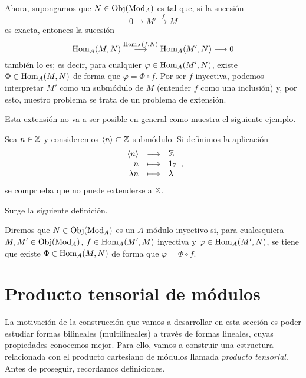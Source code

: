 \documentclass[../main.tex]{subfiles}
\begin{document}
Ahora, supongamos que $N\in\operatorname{Obj}(\operatorname{Mod}_A)$ es tal que, si la sucesión
$$0\longrightarrow M'\overset{f}{\longrightarrow}M$$
es exacta, entonces la sucesión
$$\operatorname{Hom}_A(M,N)\overset{\operatorname{Hom}_A(f,N)}{\longrightarrow}\operatorname{Hom}_A(M',N)\longrightarrow0$$
también lo es; es decir, para cualquier $\varphi\in\operatorname{Hom}_A(M',N)$, existe $\Phi\in\operatorname{Hom}_A(M,N)$ de forma que $\varphi=\Phi\circ f$. Por ser $f$ inyectiva, podemos interpretar $M'$ como un submódulo de $M$ (entender $f$ como una inclusión) y, por esto, nuestro problema se trata de un problema de extensión.

Esta extensión no va a ser posible en general como muestra el siguiente ejemplo.
\begin{example}
	Sea $n\in\mathbb{Z}$ y consideremos $\langle n\rangle\subset\mathbb{Z}$ submódulo. Si definimos la aplicación
	$$\begin{array}{rcl}
	\langle n\rangle&\longrightarrow&\mathbb{Z}\\
	n&\longmapsto&1_{\mathbb{Z}}\\
	\lambda n&\longmapsto&\lambda
	\end{array},$$
	se comprueba que no puede extenderse a $\mathbb{Z}$.
\end{example}

Surge la siguiente definición.

\begin{definition}
	Diremos que $N\in\operatorname{Obj}(\operatorname{Mod}_A)$ es un $A$-módulo inyectivo si, para cualesquiera $M,M'\in\operatorname{Obj}(\operatorname{Mod}_A)$, $f\in\operatorname{Hom}_A(M',M)$ inyectiva y $\varphi\in\operatorname{Hom}_A(M',N)$, se tiene que existe $\Phi\in\operatorname{Hom}_A(M,N)$ de forma que $\varphi=\Phi\circ f$.
\end{definition}

\section{Producto tensorial de módulos}

La motivación de la construcción que vamos a desarrollar en esta sección es poder estudiar formas bilineales (multilineales) a través de formas lineales, cuyas propiedades conocemos mejor. Para ello, vamos a construir una estructura relacionada con el producto cartesiano de módulos llamada \emph{producto tensorial}. Antes de proseguir, recordamos definiciones.
\end{document}
